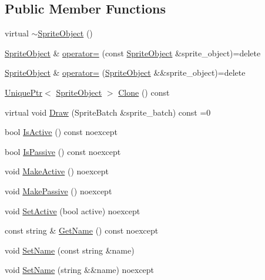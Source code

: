 \subsection*{Public Member Functions}
\begin{DoxyCompactItemize}
\item 
virtual \hyperlink{classmage_1_1_sprite_object_aad4d1472cb468d8c19b61ab030332ceb}{$\sim$\+Sprite\+Object} ()
\item 
\hyperlink{classmage_1_1_sprite_object}{Sprite\+Object} \& \hyperlink{classmage_1_1_sprite_object_ab24af642e7c49a13ca5526248f106b4e}{operator=} (const \hyperlink{classmage_1_1_sprite_object}{Sprite\+Object} \&sprite\+\_\+object)=delete
\item 
\hyperlink{classmage_1_1_sprite_object}{Sprite\+Object} \& \hyperlink{classmage_1_1_sprite_object_a0d098954e6ef5b331b2b7e6f6cb3c21e}{operator=} (\hyperlink{classmage_1_1_sprite_object}{Sprite\+Object} \&\&sprite\+\_\+object)=delete
\item 
\hyperlink{namespacemage_a3316d7143a973e37adf1110f2e80ca31}{Unique\+Ptr}$<$ \hyperlink{classmage_1_1_sprite_object}{Sprite\+Object} $>$ \hyperlink{classmage_1_1_sprite_object_a761528ee815cbac83f9a490e07752e5c}{Clone} () const
\item 
virtual void \hyperlink{classmage_1_1_sprite_object_a1c1c885fe7846f7ee1cc0b73571c2fa0}{Draw} (Sprite\+Batch \&sprite\+\_\+batch) const =0
\item 
bool \hyperlink{classmage_1_1_sprite_object_a4fbb934427eee923548dd027e19dc9ba}{Is\+Active} () const noexcept
\item 
bool \hyperlink{classmage_1_1_sprite_object_a194682f23dbdf7ce5a7345eaba4c2fa1}{Is\+Passive} () const noexcept
\item 
void \hyperlink{classmage_1_1_sprite_object_a145bdced3ec8ef41dfaf615f4ad7b1ef}{Make\+Active} () noexcept
\item 
void \hyperlink{classmage_1_1_sprite_object_a0d778b381ab405ae5fc6a858d6d465e0}{Make\+Passive} () noexcept
\item 
void \hyperlink{classmage_1_1_sprite_object_a8f27da427493db1567b842b83fa10f65}{Set\+Active} (bool active) noexcept
\item 
const string \& \hyperlink{classmage_1_1_sprite_object_a1bfe66d73a37eac4c8e8a7b0e17112aa}{Get\+Name} () const noexcept
\item 
void \hyperlink{classmage_1_1_sprite_object_a784cd7d61f3a9f71a521656ae3199366}{Set\+Name} (const string \&name)
\item 
void \hyperlink{classmage_1_1_sprite_object_a62d570d43c7b83042f0709fef6e273f4}{Set\+Name} (string \&\&name) noexcept

\end{DoxyCompactItemize}
